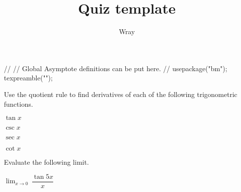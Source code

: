 \documentclass[addpoints, 12pt]{exam}
\title{Quiz template}
\author{Wray}
\begin{document}
\begin{asydef}
//
// Global Asymptote definitions can be put here.
//
usepackage("bm");
texpreamble("\def\V#1{\bm{#1}}");
\end{asydef}



\bigskip

             
\bigskip
\bigskip
Use the quotient rule to find derivatives of each of the following trigonometric functions.
\begin{questions}

\question[4]
$\tan x$

\question[4]
$\csc x$

\clearpage

\question[4]
$\sec x$

\question[4]
$\cot x$

\end{questions}
Evaluate the following limit.
\begin{questions}
\setcounter{question}{4}
\question[4]
$\displaystyle \lim_{x \to 0} \> \dfrac{\tan 5x}{x}$

\end{questions}
\end{document}
